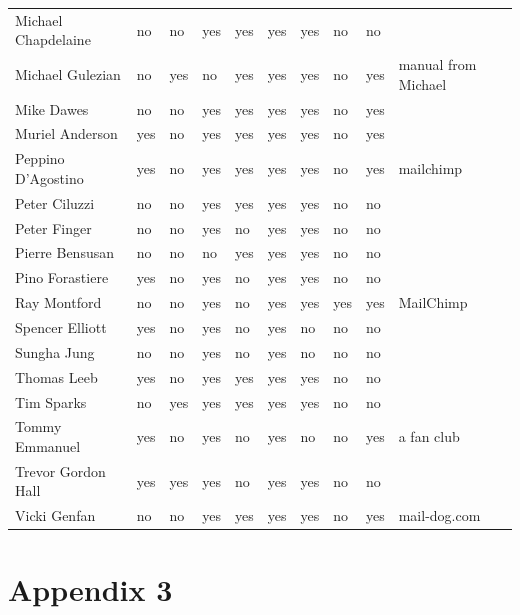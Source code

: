 \documentclass[unicode,hyperfootnotes=false,xetex,colorlinks=true,nofonts,nobib]{tufte-handout}
\begin{document}
\begin{longtable}{l p{} l l l l l p{} l p{}}
  Michael Chapdelaine & no & no & yes & yes & yes & yes & no & no & \\
  Michael Gulezian & no & yes & no & yes & yes & yes & no & yes & manual from Michael\\
  Mike Dawes & no & no & yes & yes & yes & yes & no & yes & \\
  Muriel Anderson & yes & no & yes & yes & yes & yes & no & yes & \\
  Peppino D’Agostino & yes & no & yes & yes & yes & yes & no & yes & mailchimp\\
  Peter Ciluzzi & no & no & yes & yes & yes & yes & no & no & \\
  Peter Finger & no & no & yes & no & yes & yes & no & no & \\
  Pierre Bensusan & no & no & no & yes & yes & yes & no & no & \\
  Pino Forastiere & yes & no & yes & no & yes & yes & no & no & \\
  Ray Montford & no & no & yes & no & yes & yes & yes & yes & MailChimp\\
  Spencer Elliott & yes & no & yes & no & yes & no & no & no & \\
  Sungha Jung & no & no & yes & no & yes & no & no & no & \\
  Thomas Leeb & yes & no & yes & yes & yes & yes & no & no & \\
  Tim Sparks & no & yes & yes & yes & yes & yes & no & no & \\
  Tommy Emmanuel & yes & no & yes & no & yes & no & no & yes & a fan club\\
  Trevor Gordon Hall & yes & yes & yes & no & yes & yes & no & no & \\
  Vicki Genfan & no & no & yes & yes & yes & yes & no & yes & mail-dog.com\\

\end{longtable}
\clearpage
\section{Appendix 3}
\label{sec:appendix-3}
\end{document}
